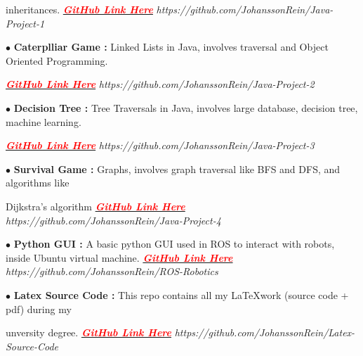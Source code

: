 \documentclass[12pt]{article}
\begin{document}
\hspace*{0.25cm} inheritances.
\href{ https://github.com/JohanssonRein/Java-Project-1}{\textbf{\textcolor{red}{\textit{GitHub Link Here}}}}
\textit{ https://github.com/JohanssonRein/Java-Project-1}

\vspace*{0.2cm}
$\bullet$ \textbf{Caterplliar Game :} Linked Lists in Java, 
involves traversal and Object Oriented Programming.

\hspace*{0.25cm}
\href{ https://github.com/JohanssonRein/Java-Project-2}{\textbf{\textcolor{red}{\textit{GitHub Link Here}}}}
\textit{ https://github.com/JohanssonRein/Java-Project-2}

\vspace*{0.2cm}
$\bullet$ \textbf{Decision Tree :} Tree Traversals in Java, involves
large database, decision tree, machine learning.

\hspace*{0.25cm}
\href{ https://github.com/JohanssonRein/Java-Project-3}{\textbf{\textcolor{red}{\textit{GitHub Link Here}}}}
\textit{ https://github.com/JohanssonRein/Java-Project-3}

\vspace*{0.2cm}
$\bullet$ \textbf{Survival Game :} Graphs, 
involves graph traversal like BFS and DFS, and algorithms like 

\hspace*{0.25cm}
Dijkstra's algorithm
\href{ https://github.com/JohanssonRein/Java-Project-4}{\textbf{\textcolor{red}{\textit{GitHub Link Here}}}}
\textit{ https://github.com/JohanssonRein/Java-Project-4}

\vspace*{0.2cm}
$\bullet$ \textbf{Python GUI :} A basic python GUI used in 
ROS to interact with robots, inside Ubuntu virtual 
\hspace*{0.25cm}
machine.
\href{https://github.com/JohanssonRein/ROS-Robotics}{\textbf{\textcolor{red}{\textit{GitHub Link Here}}}}
\textit{https://github.com/JohanssonRein/ROS-Robotics}

\vspace*{0.2cm}
$\bullet$ \textbf{Latex Source Code :} This repo contains all
my \LaTeX  work (source code + pdf) during my 

\hspace*{0.2cm}
unversity degree. 
\href{https://github.com/JohanssonRein/Latex-Source-Code}{\textbf{\textcolor{red}{\textit{GitHub Link Here}}}}
\textit{https://github.com/JohanssonRein/Latex-Source-Code}
\end{document}
